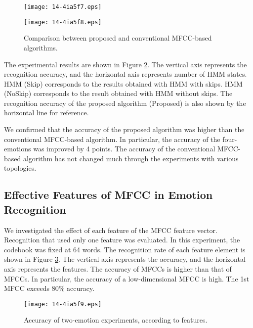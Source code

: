 \documentclass[english]{jnlp_1.3e}
\begin{document}
\begin{figure}[t]
\begin{center}
    \texttt{[image: 14-4ia5f7.eps]}
\label{fig07}
\end{center}
\end{figure}
\begin{figure}[t]
\begin{center}
    \texttt{[image: 14-4ia5f8.eps]}
\caption{Comparison between proposed and conventional MFCC-based algorithms.}
\label{fig08}
\end{center}
\end{figure}


The experimental results are shown in Figure \ref{fig08}. The vertical axis represents the recognition accuracy, and the horizontal axis represents number of HMM states. HMM (Skip) corresponds to the results obtained with HMM with skips. HMM (NoSkip) corresponds to the result obtained with HMM without skips. The recognition accuracy of the proposed algorithm (Proposed) is also shown by the horizontal line for reference.

We confirmed that the accuracy of the proposed algorithm was higher than the conventional MFCC-based algorithm. In particular, the accuracy of the four-emotions was improved by 4 points. The accuracy of the conventional MFCC-based algorithm has not changed much through the experiments with various topologies.

\subsection{Effective Features of MFCC in Emotion Recognition}

We investigated the effect of each feature of the MFCC feature vector. Recognition that used only one feature was evaluated. In this experiment, the codebook was fixed at 64 words. The recognition rate of each feature element is shown in Figure \ref{fig09}. The vertical axis represents the accuracy, and the horizontal axis represents the features. The accuracy of MFCCs is higher than that of  MFCCs. In particular, the accuracy of a low-dimensional MFCC is high. The 1st MFCC exceeds 80\% accuracy.

\begin{figure}[t]
\begin{center}
    \texttt{[image: 14-4ia5f9.eps]}
\caption{Accuracy of two-emotion experiments, according to features.}
\label{fig09}
\end{center}
\end{figure}
\end{document}
